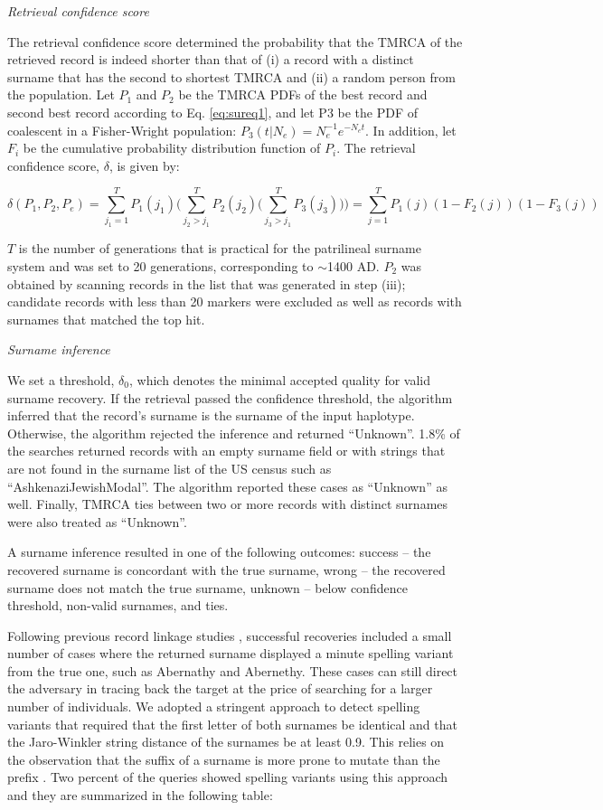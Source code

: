 \emph{Retrieval confidence score}

The retrieval confidence score determined the probability that the TMRCA of the retrieved record is indeed shorter than that of (i) a record with a distinct surname that has the second to shortest TMRCA and (ii) a random person from the population. Let $P_1$ and $P_2$ be the TMRCA PDFs of the best record and second best record according to Eq. \ref{eq:sureq1}, and let P3 be the PDF of coalescent in a Fisher-Wright population: $P_3 (t|N_e)=N_e^{-1} e^{-N_e t}$. In addition, let $F_i$ be the cumulative probability distribution function of $P_i$. The retrieval confidence score, $\delta$, is given by:

\begin{equation}
\delta(P_1,P_2,P_e) = \sum_{j_1=1}^TP_1(j_1)
\Bigg(
\sum_{j_2>j_1}^TP_2(j_2)
 \Big(
 \sum_{j_3>j_1}^TP_3(j_3)
 \Big)
\Bigg) = \sum_{j=1}^TP_1(j)(1-F_2(j))(1-F_3(j))
\end{equation}

$T$ is the number of generations that is practical for the patrilineal surname system and was set to 20 generations, corresponding to $\sim$1400 AD. $P_2$ was obtained by scanning records in the list that was generated in step (iii); candidate records with less than 20 markers were excluded as well as records with surnames that matched the top hit.

\emph{Surname inference}

We set a threshold, $\delta_0$, which denotes the minimal accepted quality for valid surname recovery. If the retrieval passed the confidence threshold, the algorithm inferred that the record's surname is the surname of the input haplotype. Otherwise, the algorithm rejected the inference and returned ``Unknown''. 1.8\% of the searches returned records with an empty surname field or with strings that are not found in the surname list of the US census such as ``AshkenaziJewishModal''. The algorithm reported these cases as ``Unknown'' as well. Finally, TMRCA ties between two or more records with distinct surnames were also treated as ``Unknown''. 

A surname inference resulted in one of the following outcomes: success – the recovered surname is concordant with the true surname, wrong – the recovered surname does not match the true surname, unknown – below confidence threshold, non-valid surnames, and ties.  

Following previous record linkage studies \cite{GrannisOverhageMcDonald2004,Winkler1995}, successful recoveries included a small number of cases where the returned surname displayed a minute spelling variant from the true one, such as Abernathy and Abernethy. These cases can still direct the adversary in tracing back the target at the price of searching for a larger number of individuals. We adopted a stringent approach to detect spelling variants that required that the first letter of both surnames be identical and that the Jaro-Winkler string distance \cite{Winkler1995} of the surnames be at least 0.9. This relies on the observation that the suffix of a surname is more prone to mutate than the prefix \cite{Winkler1995}. Two percent of the queries showed spelling variants using this approach and they are summarized in the following table:

